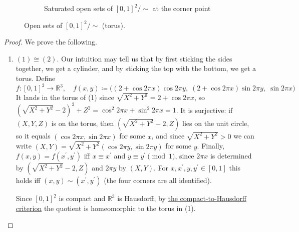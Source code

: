 \begin{definition}
\begin{enumerate}
\begin{figure}[H]
\begin{subfigure}[t]{0.32\textwidth}
						\caption{Saturated open sets of $[0,1]^2/{\sim}$ at the corner point}
						\label{fig:tor_sq_c}
					\end{subfigure}
					\caption{Open sets of $[0,1]^2/{\sim}$ (torus).}
					\label{fig:tor_sq}
				\end{figure}
		\end{enumerate}
	\end{definition}
	\begin{proof}
	  We prove the following. 
		\begin{enumerate}
		  \item $(1) \cong (2)$. Our intuition may tell us that by first sticking the sides together, we get a cylinder, and by sticking the top with the bottom, we get a torus. Define 
				\begin{equation}
					f: [0, 1]^2 \rightarrow \mathbb{R}^3, \quad f(x, y) \coloneqq \big( (2 + \cos{2 \pi x}) \cos{2\pi y}, \; (2 + \cos{2 \pi x}) \sin{2 \pi y}, \; \sin{2 \pi x} \big)
				\end{equation}
				It lands in the torus of (1) since $\sqrt{X^2 + Y^2} = 2 + \cos 2\pi x$, so $(\sqrt{X^2 + Y^2} - 2)^2 + Z^2 = \cos^2 2\pi x + \sin^2 2\pi x = 1$. It is surjective: if $(X, Y, Z)$ is on the torus, then $(\sqrt{X^2 + Y^2} - 2, Z)$ lies on the unit circle, so it equals $(\cos 2\pi x, \sin 2\pi x)$ for some $x$, and since $\sqrt{X^2 + Y^2} > 0$ we can write $(X, Y) = \sqrt{X^2 + Y^2} (\cos 2\pi y, \sin 2\pi y)$ for some $y$. Finally, $f(x, y) = f(x^\prime, y^\prime)$ iff $x \equiv x^\prime$ and $y \equiv y^\prime \pmod 1$, since $2\pi x$ is determined by $(\sqrt{X^2 + Y^2} - 2, Z)$ and $2\pi y$ by $(X, Y)$. For $x, x^\prime, y, y^\prime \in [0, 1]$ this holds iff $(x, y) \sim (x^\prime, y^\prime)$ (the four corners are all identified). 


				Since $[0, 1]^2$ is compact and $\mathbb{R}^3$ is Hausdorff, by \hyperref[thm:compact_hausdorff_quotient]{the compact-to-Hausdorff criterion} the quotient is homeomorphic to the torus in (1). 
		\end{enumerate}
	\end{proof}

